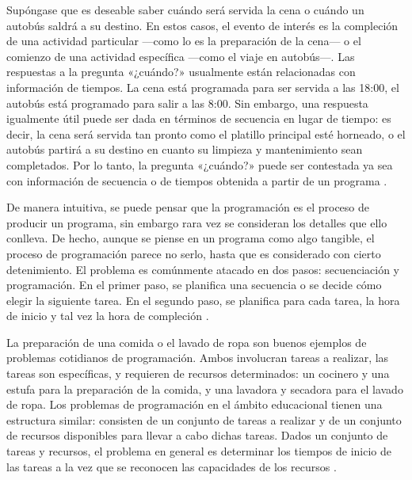 \documentclass[draft,12pt,headsepline,footsepline,paper=letter]{scrreprt}
\begin{document}
Supóngase que es deseable saber cuándo será servida la cena o cuándo un autobús saldrá a su destino. En estos casos, el evento de interés es la compleción de una actividad particular —como lo es la preparación de la cena— o el comienzo de una actividad específica —como el viaje en autobús—. Las respuestas a la pregunta «¿cuándo?» usualmente están relacionadas con información de tiempos. La cena está programada para ser servida a las 18:00, el autobús está programado para salir a las 8:00. Sin embargo, una respuesta igualmente útil puede ser dada en términos de secuencia en lugar de tiempo: es decir, la cena será servida tan pronto como el platillo principal esté horneado, o el autobús partirá a su destino en cuanto su limpieza y mantenimiento sean completados. Por lo tanto, la pregunta «¿cuándo?» puede ser contestada ya sea con información de secuencia o de tiempos obtenida a partir de un programa \citep[p.~1]{Baker2009}.

De manera intuitiva, se puede pensar que la programación es el proceso de producir un programa, sin embargo rara vez se consideran los detalles que ello conlleva. De hecho, aunque se piense en un programa como algo tangible, el proceso de programación parece no serlo, hasta que es considerado con cierto detenimiento. El problema es comúnmente atacado en dos pasos: secuenciación y programación. En el primer paso, se planifica una secuencia o se decide cómo elegir la siguiente tarea. En el segundo paso, se planifica para cada tarea, la hora de inicio y tal vez la hora de compleción \citep[p.~2]{Baker2009}.

La preparación de una comida o el lavado de ropa son buenos ejemplos de problemas cotidianos de programación. Ambos involucran tareas a realizar, las tareas son específicas, y requieren de recursos determinados: un cocinero y una estufa para la preparación de la comida, y una lavadora y secadora para el lavado de ropa.  Los problemas de programación en el ámbito educacional tienen una estructura similar: consisten de un conjunto de tareas a realizar y de un conjunto de recursos disponibles para llevar a cabo dichas tareas. Dados un conjunto de tareas y recursos, el problema en general es determinar los tiempos de inicio de las tareas a la vez que se reconocen las capacidades de los recursos \citep[p.~2]{Baker2009}.
\end{document}
